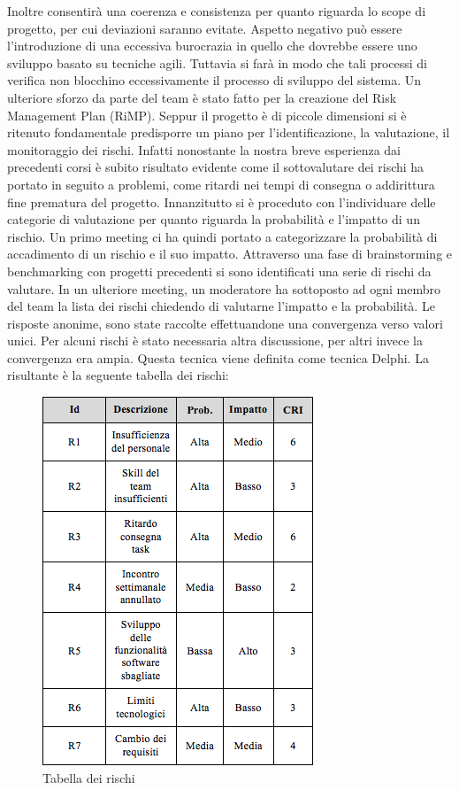 Inoltre consentir\`{a} una coerenza e consistenza per quanto riguarda lo scope di progetto, per cui deviazioni saranno evitate.
Aspetto negativo pu\`{o} essere l\rq introduzione di una eccessiva burocrazia in quello che dovrebbe essere uno sviluppo basato su tecniche agili. Tuttavia si far\`{a} in modo che tali processi di verifica non blocchino eccessivamente il processo di sviluppo del sistema.
Un ulteriore sforzo da parte del team \`{e} stato fatto per la creazione del Risk Management Plan (RiMP).
Seppur il progetto \`{e} di piccole dimensioni si \`{e} ritenuto fondamentale predisporre un piano per l\rq identificazione, la valutazione, il monitoraggio dei rischi.
Infatti nonostante la nostra breve esperienza dai precedenti corsi \`{e} subito risultato evidente come il sottovalutare dei rischi ha portato in seguito a problemi, come ritardi nei tempi di consegna o addirittura fine prematura del progetto.
Innanzitutto si \`{e} proceduto con l\rq individuare delle categorie di valutazione per quanto riguarda la probabilit\`{a} e l\rq impatto di un rischio.
Un primo meeting ci ha quindi portato a categorizzare la probabilit\`{a} di accadimento di un rischio e il suo impatto.
Attraverso una fase di brainstorming e benchmarking con progetti precedenti si sono identificati una serie di rischi da valutare. 
In un ulteriore meeting, un moderatore ha sottoposto ad ogni membro del team la lista dei rischi chiedendo di valutarne l\rq impatto e la probabilit\`{a}. Le risposte anonime, sono state raccolte effettuandone una convergenza verso valori unici.
Per alcuni rischi \`{e} stato necessaria altra discussione, per altri invece la convergenza era ampia. Questa tecnica viene definita come tecnica Delphi.
La risultante \`{e} la seguente tabella dei rischi:
\begin{figure}[h]
\centering
\includegraphics[scale=.6]{img/17.png}
\caption{Tabella dei rischi}
\label{fig:cd}
\end{figure}
